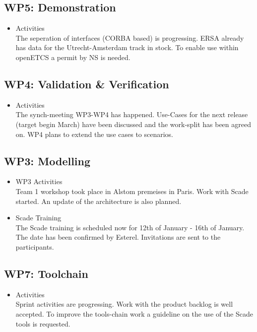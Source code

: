 \documentclass[a4paper, 11pt]{article}
\begin{document}
\subsection{WP5: Demonstration}
\begin{itemize}
\item Activities\\
The seperation of interfaces (CORBA based) is progressing.  ERSA already has data for the Utrecht-Amsterdam track in stock. To enable use within openETCS a permit by NS is needed. 

\end{itemize}

\subsection{WP4: Validation \& Verification}
\begin{itemize}
\item Activities\\
The synch-meeting WP3-WP4 has happened. Use-Cases for the next release (target begin March) have been discussed and the work-split has been agreed on. WP4 plans to extend the use cases to scenarios. 
\end{itemize}

\subsection{WP3: Modelling}
\begin{itemize}

\item WP3 Activities\\
Team 1 workshop took place in Alstom premeises in Paris. Work with Scade started. An update of the architecture is also planned. 

\item Scade Training\\
The Scade training is scheduled now for 12th of January - 16th of January.
The date has been confirmed by Esterel. Invitations are sent to the participants.

\end{itemize}

\subsection{WP7: Toolchain}

\begin{itemize}
\item Activities\\
Sprint activities are progressing. Work with the product backlog is well accepted. To improve the tools-chain work a guideline on the use of the Scade tools is requested.

\end{itemize}
\end{document}
